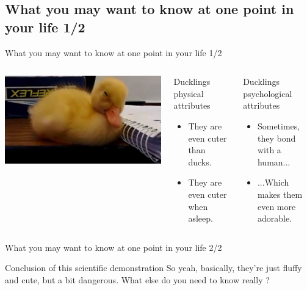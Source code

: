 \documentclass[11pt]{beamer}
\begin{document}
\subsection{What you may want to know at one point in your life 1/2}
\begin{frame}{What you may want to know at one point in your life 1/2}
    \begin{columns}[c] %
        \includegraphics[width = .8\textwidth]{sleepyduck.jpg}
        \pause
        \begin{block}{Ducklings physical attributes}
            \begin{itemize}
                \item They are even cuter than ducks.
                \item They are even cuter when asleep.
            \end{itemize}
        \end{block}
		\pause
        \begin{block}{Ducklings psychological attributes}
            \begin{itemize}
                \item Sometimes, they bond with a human...
                \item ...Which makes them even more adorable.
            \end{itemize}
        \end{block}
    \end{columns}
\end{frame}

\begin{frame}{What you may want to know at one point in your life 2/2}
\begin{block}{Conclusion of this scientific demonstration}
So yeah, basically, they're just fluffy and cute, but a bit dangerous. What else do you need to know really ?
\end{block}
\end{frame}
\end{document}
